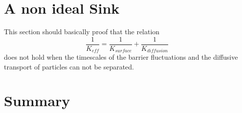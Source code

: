 \newpage
\section{A non ideal Sink}
This section should basically proof that the relation
\begin{equation}
    \frac{1}{K_{eff}} = \frac{1}{K_{surface}}+\frac{1}{K_{diffusion}}
    \label{addition_of_rates}
\end{equation}
does not hold when the timescales of the barrier fluctuations and the diffusive transport of particles can not be separated.


\newpage
\section{Summary}
